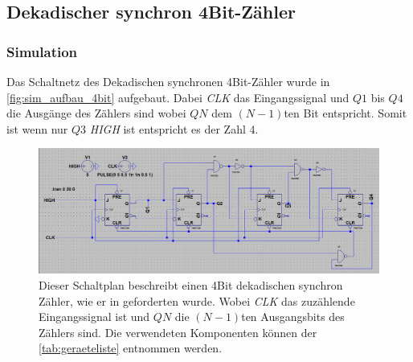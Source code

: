 \documentclass[12pt,english,ngerman]{scrartcl}
\begin{document}




\subsection{Dekadischer synchron 4Bit-Zähler}
\subsubsection{Simulation}

Das Schaltnetz des Dekadischen synchronen 4Bit-Zähler wurde in
\autoref{fig:sim_aufbau_4bit} aufgebaut. Dabei \textit{CLK} das Eingangssignal
und $Q1$ bis $Q4$ die Ausgänge des Zählers sind wobei $QN$ dem $(N-1)$ten Bit
entspricht. Somit ist wenn nur $Q3$ \textit{HIGH} ist entspricht es der Zahl 4.

\begin{figure}[H]
  \centering
    \includegraphics[width=\linewidth]{./figures/sim/4bit/aufbau4bit.png}
    \caption{Dieser Schaltplan beschreibt einen 4Bit dekadischen synchron
      Zähler, wie er in  geforderten wurde. Wobei
      \textit{CLK} das zuzählende Eingangssignal ist und $QN$ die $(N-1)$ten
      Ausgangsbits des Zählers sind. Die verwendeten Komponenten können der
      \autoref{tab:geraeteliste} entnommen werden.}
  \label{fig:sim_aufbau_4bit}
\end{figure}
\end{document}
